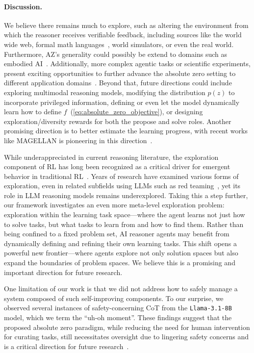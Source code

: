 \documentclass{article}
\begin{document}
\paragraph{Discussion.} We believe there remains much to explore, such as altering the environment from which the reasoner receives verifiable feedback, including sources like the world wide web, formal math languages~\cite{sutton2019keytoai,ren2025deepseekproverv2advancingformalmathematical}, world simulators, or even the real world. Furthermore, AZ's generality could possibly be extend to domains such as embodied AI~\citep{brohan2023rt,yue2024deer}. Additionally, more complex agentic tasks or scientific experiments, present exciting opportunities to further advance the absolute zero setting to different application domains~\citep{stateflow, autogen}. Beyond that, future directions could include exploring multimodal reasoning models, modifying the distribution \(p(z)\) to incorporate privileged information, defining or even let the model dynamically learn how to define \(f\)~(\cref{eq:absolute_zero_objective}), or designing exploration/diversity rewards for both the propose and solve roles. Another promising direction is to better estimate the learning progress, with recent works like MAGELLAN is pioneering in this direction~\citep{gaven2025magellan}.

While underappreciated in current reasoning literature, the exploration component of RL has long been recognized as a critical driver for emergent behavior in traditional RL~\citep{yue2025doesreinforcementlearningreally,silver2016mastering,Ladosz2022ExplorationID,pourcel2024aces}. Years of research have examined various forms of exploration, even in related subfields using  LLMs such as red teaming~\cite{zhao2024diver}, yet its role in LLM reasoning models remains underexplored. Taking this a step further, our framework investigates an even more meta-level exploration problem: exploration within the learning task space—where the agent learns not just how to solve tasks, but what tasks to learn from and how to find them. Rather than being confined to a fixed problem set, AI reasoner agents may benefit from dynamically defining and refining their own learning tasks. This shift opens a powerful new frontier—where agents explore not only solution spaces but also expand the boundaries of problem spaces. We believe this is a promising and important direction for future research.

One limitation of our work is that we did not address how to safely manage a system composed of such self-improving components. To our surprise, we observed several instances of safety-concerning CoT from the \texttt{Llama-3.1-8B} model, which we term the ``uh-oh moment''. These findings suggest that the proposed absolute zero paradigm, while reducing the need for human intervention for curating tasks, still necessitates oversight due to lingering safety concerns and is a critical direction for future research~\cite{wang-etal-2024-boosting-llm, wang-etal-2025-model}.
\end{document}
